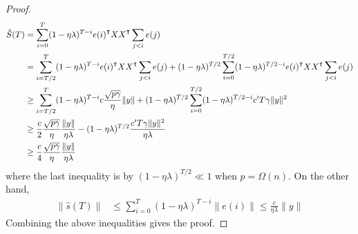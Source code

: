 \begin{proof}
\begin{equation*}
\begin{aligned}
    \hat{S}(T) &= \sum_{i=0}^T(1-\eta\lambda)^{T-i}e(i)\transpose XX\transpose \sum_{j<i}e(j) \\
    &= \sum_{i=T/2}^T(1-\eta\lambda)^{T-i}e(i)\transpose XX\transpose \sum_{j<i}e(j) + (1-\eta\lambda)^{T/2}\sum_{i=0}^{T/2}(1-\eta\lambda)^{T/2-i}e(i)\transpose XX\transpose \sum_{j<i}e(j) \\
    &\geq \sum_{i=T/2}^T(1-\eta\lambda)^{T-i}c\frac{\sqrt{p\gamma}}{\eta}\|y\| + (1-\eta\lambda)^{T/2}\sum_{i=0}^{T/2}(1-\eta\lambda)^{T/2-i}c'T\gamma\|y\|^2 \\
    &\geq \frac{c}{2}\frac{\sqrt{p\gamma}}{\eta}\frac{\|y\|}{\eta\lambda} -(1-\eta\lambda)^{T/2}\frac{c'T\gamma\|y\|^2}{\eta\lambda} \\
    &\geq \frac{c}{4}\frac{\sqrt{p\gamma}}{\eta}\frac{\|y\|}{\eta\lambda}
\end{aligned}
\end{equation*}
where the last inequality is by $(1-\eta\lambda)^{T/2}\ll 1$ when $p=\Omega(n)$. On the other hand,
\begin{equation*}
\begin{aligned}
\|\hat{s}(T)\|  
&\leq \sum_{i=0}^T(1-\eta\lambda)^{T-i}\|e(i)\|\leq \frac{c}{\eta\lambda}\|y\|
\end{aligned}
\end{equation*}
Combining the above inequalities gives the proof.
\end{proof}

